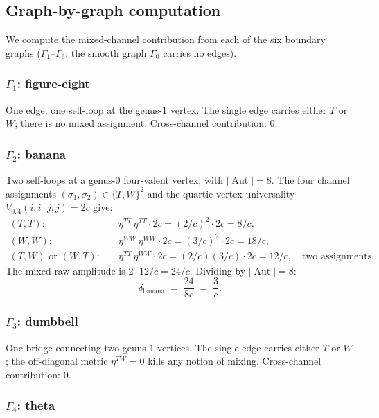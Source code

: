 \documentclass[11pt]{article}
\theoremstyle{plain}
\theoremstyle{definition}
\theoremstyle{remark}
\DeclareMathOperator{\Aut}{Aut}
\begin{document}
\subsection{Graph-by-graph computation}

We compute the mixed-channel contribution from each
of the six boundary graphs ($\Gamma_1$--$\Gamma_6$;
the smooth graph $\Gamma_0$ carries no edges).

\subsubsection*{$\Gamma_1$: figure-eight}

One edge, one self-loop at the genus-$1$ vertex.
The single edge carries either $T$ or~$W$; there is no
mixed assignment. Cross-channel contribution: $0$.

\subsubsection*{$\Gamma_2$: banana}

Two self-loops at a genus-$0$ four-valent vertex, with
$|\Aut| = 8$.
The four channel assignments $(\sigma_1, \sigma_2) \in
\{T,W\}^2$ and the quartic vertex universality
$V_{0,4}(i,i\,|\,j,j) = 2c$ give:
\begin{align*}
 (T,T):&\quad \eta^{TT}\,\eta^{TT}\cdot 2c
 = (2/c)^2 \cdot 2c = 8/c, \\
 (W,W):&\quad \eta^{WW}\,\eta^{WW}\cdot 2c
 = (3/c)^2 \cdot 2c = 18/c, \\
 (T,W)\text{ or }(W,T):&\quad
 \eta^{TT}\,\eta^{WW}\cdot 2c
 = (2/c)(3/c) \cdot 2c = 12/c,
 \quad\text{two assignments.}
\end{align*}
The mixed raw amplitude is $2 \cdot 12/c = 24/c$.
Dividing by $|\Aut| = 8$:
\begin{equation}\label{eq:banana-cross}
 \delta_{\mathrm{banana}}
 \;=\; \frac{24}{8c}
 \;=\; \frac{3}{c}.
\end{equation}

\subsubsection*{$\Gamma_3$: dumbbell}

One bridge connecting two genus-$1$ vertices. The single
edge carries either $T$ or $W$; the off-diagonal metric
$\eta^{TW} = 0$ kills any notion of mixing.
Cross-channel contribution: $0$.

\subsubsection*{$\Gamma_4$: theta}
\end{document}
